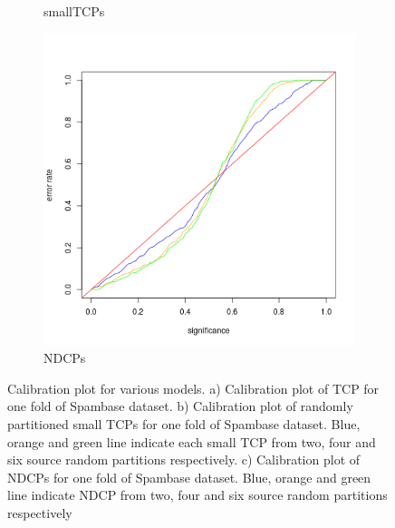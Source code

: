 \documentclass[main]{subfiles}
\begin{document}
\begin{figure}[H]
\begin{center}
\begin{subfigure}{.3\textwidth}
  \caption{smallTCPs}\label{fig:valIndividual}
  \end{subfigure}
  \begin{subfigure}{.3\textwidth}
  \centering
  \includegraphics[scale=0.2]{images/eqSourceCombined}
  \caption{NDCPs}\label{fig:valCombined}
  \end{subfigure}
  
 \caption{Calibration plot for various models. a) Calibration plot of TCP for one fold of Spambase dataset. b) Calibration plot of randomly partitioned small TCPs for one fold of  Spambase dataset. Blue, orange and  green line indicate each small TCP from two, four and six source random partitions respectively. c) Calibration plot of NDCPs for one fold of Spambase dataset. Blue, orange and  green line indicate NDCP from two, four and six source random partitions respectively}
 
\end{center}
\end{figure}


\end{document}
